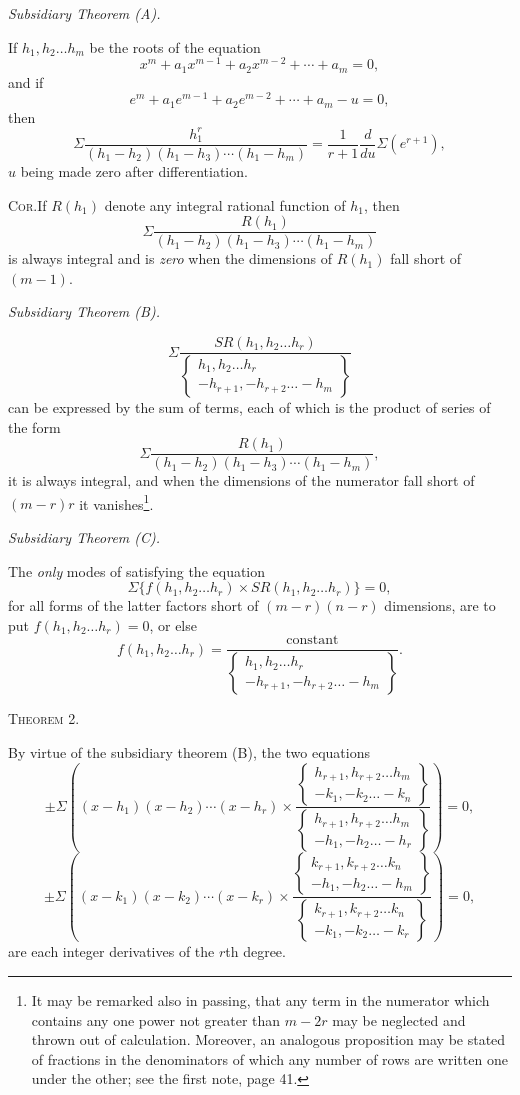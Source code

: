 \documentclass[11pt]{article}
\newcommand{\sourcepage}[1]{\marginpar{\scriptsize p.~#1}}
\newcommand{\theoremhead}[1]{\vspace{0.75em}\begin{center}{\scshape Theorem #1.}\end{center}\vspace{0.15em}}
\newcommand{\SR}{\mathit{SR}}
\newcommand{\rowpair}[2]{\left\{\begin{matrix}#1\\#2\end{matrix}\right\}}
\begin{document}
\sourcepage{42}
\begin{center}\itshape Subsidiary Theorem (A).\end{center}

If $h_1,h_2\ldots h_m$ be the roots of the equation
\[
 x^m+a_1x^{m-1}+a_2x^{m-2}+\cdots+a_m=0,
\]
and if
\[
 e^m+a_1e^{m-1}+a_2e^{m-2}+\cdots+a_m-u=0,
\]
then
\[
 \Sigma\frac{h_1^r}{(h_1-h_2)(h_1-h_3)\cdots(h_1-h_m)}
 =\frac{1}{r+1}\frac{d}{du}\Sigma(e^{r+1}),
\]
$u$ being made zero after differentiation.

\textsc{Cor.}\quad If $R(h_1)$ denote any integral rational function of $h_1$, then
\[
 \Sigma\frac{R(h_1)}{(h_1-h_2)(h_1-h_3)\cdots(h_1-h_m)}
\]
is always integral and is \emph{zero} when the dimensions of $R(h_1)$ fall short of $(m-1)$.

\begin{center}\itshape Subsidiary Theorem (B).\end{center}
\[
 \Sigma\frac{\SR(h_1,h_2\ldots h_r)}{
 \rowpair{h_1,h_2\ldots h_r}{-h_{r+1},-h_{r+2}\ldots -h_m}}
\]
can be expressed by the sum of terms, each of which is the product of series of the form
\[
 \Sigma\frac{R(h_1)}{(h_1-h_2)(h_1-h_3)\cdots(h_1-h_m)},
\]
it is always integral, and when the dimensions of the numerator fall short of $(m-r)r$ it vanishes\footnote{It may be remarked also in passing, that any term in the numerator which contains any one power not greater than $m-2r$ may be neglected and thrown out of calculation. Moreover, an analogous proposition may be stated of fractions in the denominators of which any number of rows are written one under the other; see the first note, page 41.}.

\begin{center}\itshape Subsidiary Theorem (C).\end{center}

The \emph{only} modes of satisfying the equation
\[
 \Sigma\{f(h_1,h_2\ldots h_r)\times \SR(h_1,h_2\ldots h_r)\}=0,
\]
for all forms of the latter factors short of $(m-r)(n-r)$ dimensions, are to put $f(h_1,h_2\ldots h_r)=0$, or else
\[
 f(h_1,h_2\ldots h_r)=\frac{\text{constant}}{
 \rowpair{h_1,h_2\ldots h_r}{-h_{r+1},-h_{r+2}\ldots -h_m}}.
\]

\sourcepage{43}
\theoremhead{2}

By virtue of the subsidiary theorem (B), the two equations
\[
 \pm\Sigma\left(
 (x-h_1)(x-h_2)\cdots(x-h_r)\times
 \frac{\rowpair{h_{r+1},h_{r+2}\ldots h_m}{-k_1,-k_2\ldots -k_n}}
 {\rowpair{h_{r+1},h_{r+2}\ldots h_m}{-h_1,-h_2\ldots -h_r}}
 \right)=0,
\]
\[
 \pm\Sigma\left(
 (x-k_1)(x-k_2)\cdots(x-k_r)\times
 \frac{\rowpair{k_{r+1},k_{r+2}\ldots k_n}{-h_1,-h_2\ldots -h_m}}
 {\rowpair{k_{r+1},k_{r+2}\ldots k_n}{-k_1,-k_2\ldots -k_r}}
 \right)=0,
\]
are each integer derivatives of the $r$th degree.
\end{document}
